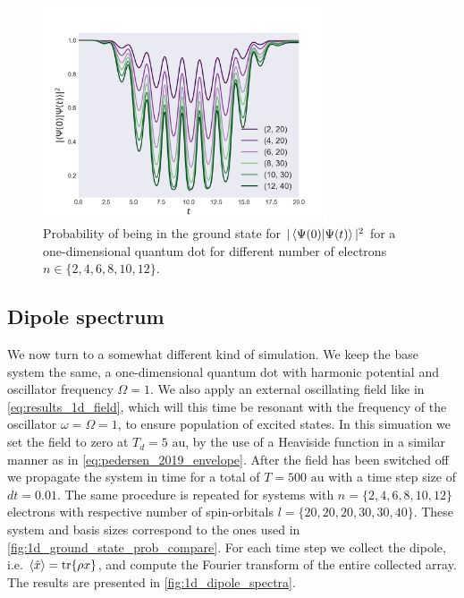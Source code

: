 \begin{figure}
    \centering
    \includegraphics[width=0.75\textwidth]{results/figures/1D/n_compare_overlap.png} 
    \caption{Probability of being in the ground state for $|\braket*{\Psi(0)}{\Psi(t)}|^2$
        for a one-dimensional quantum dot for different number of electrons 
        $n\in\{2,4,6,8,10,12\}$.
    }
    \label{fig:1d_ground_state_prob_compare}
\end{figure}

\subsection{Dipole spectrum}

We now turn to a somewhat different kind of simulation. We keep the 
base system the same, a one-dimensional quantum dot with harmonic potential and oscillator 
frequency $\Omega=1$. We also apply an external oscillating field like in
\autoref{eq:results_1d_field}, which will this time be resonant with the frequency of the 
oscillator $\omega=\Omega=1$, to ensure population of excited states. In this simuation 
we set the field to zero at $T_d = 5 \text{ au}$, by the use of a Heaviside function in a 
similar manner as \citeauthor{pedersen2019symplectic}\cite{pedersen2019symplectic}
in \autoref{eq:pedersen_2019_envelope}. After the field has been switched off we propagate 
the system in time for a total of $T = 500 \text{ au}$ with a time step size of $dt=0.01$.
The same procedure is repeated for systems with $n=\{2,4,6,8,10,12\}$ electrons with 
respective number of spin-orbitals $l=\{20,20,20,30,30,40\}$. These system and basis 
sizes correspond to the ones used in \autoref{fig:1d_ground_state_prob_compare}.
For each time step we collect the dipole, i.e. $\ev{\hat{x}} = \tr{\rho x}$, and compute the 
Fourier transform of the entire collected array. The results are presented in 
\autoref{fig:1d_dipole_spectra}.

